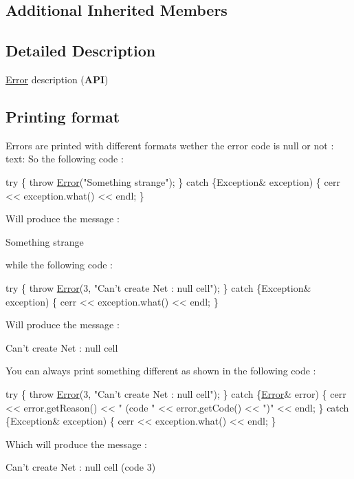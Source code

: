 \subsection*{Additional Inherited Members}


\subsection{Detailed Description}
\hyperlink{classHurricane_1_1Error}{Error} description ({\bfseries A\+PI}) 

\hypertarget{classHurricane_1_1Error_secErrorPrintingFormat}{}\subsection{Printing format}\label{classHurricane_1_1Error_secErrorPrintingFormat}
Errors are printed with different formats wether the error code is null or not \+: text\+: So the following code \+: 
\begin{DoxyCode}
\textcolor{keywordflow}{try} \{
   \textcolor{keywordflow}{throw} \hyperlink{classHurricane_1_1Error_ab58387c890740ed8082532c5342f2d03}{Error}(\textcolor{stringliteral}{"Something strange"});
\}
\textcolor{keywordflow}{catch} \{Exception& exception) \{
   cerr << exception.what() << endl;
\}
\end{DoxyCode}
 Will produce the message \+: 
\begin{DoxyCode}
[ERROR] Something strange
\end{DoxyCode}
 while the following code \+: 
\begin{DoxyCode}
\textcolor{keywordflow}{try} \{
   \textcolor{keywordflow}{throw} \hyperlink{classHurricane_1_1Error_ab58387c890740ed8082532c5342f2d03}{Error}(3, \textcolor{stringliteral}{"Can't create Net : null cell"});
\}
\textcolor{keywordflow}{catch} \{Exception& exception) \{
   cerr << exception.what() << endl;
\}
\end{DoxyCode}
 Will produce the message \+: 
\begin{DoxyCode}
[ERROR:3] Can\textcolor{stringliteral}{'t create Net : null cell}
\end{DoxyCode}
 You can always print something different as shown in the following code \+: 
\begin{DoxyCode}
\textcolor{keywordflow}{try} \{
   \textcolor{keywordflow}{throw} \hyperlink{classHurricane_1_1Error_ab58387c890740ed8082532c5342f2d03}{Error}(3, \textcolor{stringliteral}{"Can't create Net : null cell"});
\}
\textcolor{keywordflow}{catch} \{\hyperlink{classHurricane_1_1Error_ab58387c890740ed8082532c5342f2d03}{Error}& error) \{
   cerr << error.getReason() << \textcolor{stringliteral}{" (code "} << error.getCode() << \textcolor{stringliteral}{")"} << endl;
\}
\textcolor{keywordflow}{catch} \{Exception& exception) \{
   cerr << exception.what() << endl;
\}
\end{DoxyCode}
 Which will produce the message \+: 
\begin{DoxyCode}
Can\textcolor{stringliteral}{'t create Net : null cell (code 3)}
\end{DoxyCode}
 

